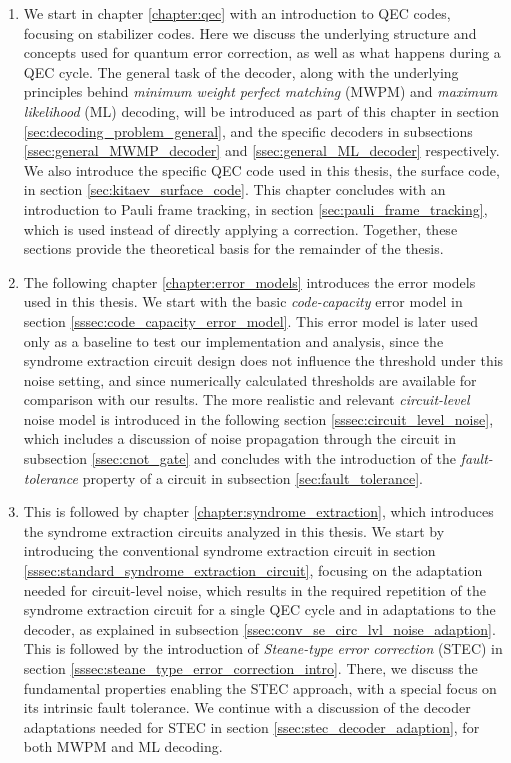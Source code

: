 \begin{enumerate}
    \item We start in chapter \ref{chapter:qec} with an introduction to QEC codes, focusing on stabilizer codes. 
    Here we discuss the underlying structure and concepts used for quantum error correction, as well as what happens during a QEC cycle. 
    The general task of the decoder, along with the underlying principles behind \emph{minimum weight perfect matching} (MWPM) and \emph{maximum likelihood} (ML) decoding, 
    will be introduced as part of this chapter in section \ref{sec:decoding_problem_general}, and the specific decoders in subsections \ref{ssec:general_MWMP_decoder} and \ref{ssec:general_ML_decoder} respectively.
    We also introduce the specific QEC code used in this thesis, the surface code, in section \ref{sec:kitaev_surface_code}.
    This chapter concludes with an introduction to Pauli frame tracking, in section \ref{sec:pauli_frame_tracking}, which is used instead of directly applying a correction. 
    Together, these sections provide the theoretical basis for the remainder of the thesis.

    \item The following chapter \ref{chapter:error_models} introduces the error models used in this thesis. 
    We start with the basic \emph{code-capacity} error model in section \ref{sssec:code_capacity_error_model}.
    This error model is later used only as a baseline to test our implementation and analysis, since the syndrome extraction circuit design does not influence the threshold under this noise setting, 
    and since numerically calculated thresholds are available for comparison with our results. 
    The more realistic and relevant \emph{circuit-level} noise model is introduced in the following section \ref{sssec:circuit_level_noise}, 
    which includes a discussion of noise propagation through the circuit in subsection \ref{ssec:cnot_gate}
    and concludes with the introduction of the \emph{fault-tolerance} property of a circuit in subsection \ref{sec:fault_tolerance}. 

    \item This is followed by chapter \ref{chapter:syndrome_extraction}, which introduces the syndrome extraction circuits analyzed in this thesis. 
    We start by introducing the conventional syndrome extraction circuit in section \ref{sssec:standard_syndrome_extraction_circuit}, 
    focusing on the adaptation needed for circuit-level noise, which results in the required repetition of the syndrome extraction circuit for a single QEC cycle and in adaptations to the decoder, 
    as explained in subsection \ref{ssec:conv_se_circ_lvl_noise_adaption}.
    This is followed by the introduction of \emph{Steane-type error correction} (STEC) in section \ref{sssec:steane_type_error_correction_intro}.
    There, we discuss the fundamental properties enabling the STEC approach, with a special focus on its intrinsic fault tolerance. 
    We continue with a discussion of the decoder adaptations needed for STEC in section \ref{ssec:stec_decoder_adaption}, for both MWPM and ML decoding.


\end{enumerate}
